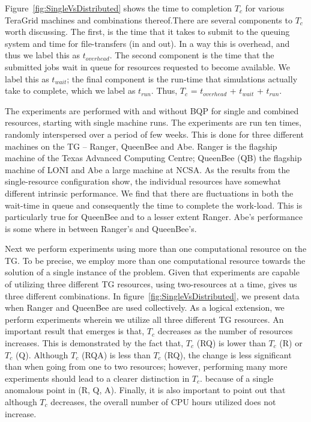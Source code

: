 \documentclass{acm_proc_article-sp}
\newcommand{\tc}{$T_c$ }
\newcommand{\tcnsp}{$T_c$}
\begin{document}
Figure~\ref{fig:SingleVsDistributed} shows the time to completion \tc
for various TeraGrid machines and combinations thereof.There are
several components to \tc worth discussing. The first, is the time
that it takes to submit to the queuing system and time for
file-transfers (in and out). In a way this is overhead, and thus we
label this as $t_{overhead}$.  The second component is the time that
the submitted jobs wait in queue for resources requested to become
available. We label this as $t_{wait}$; the final component is the
run-time that simulations actually take to complete, which we label as
$t_{run}$. Thus, \tc = $t_{overhead}$ + $t_{wait}$ + $t_{run}$.

The experiments are performed with and without BQP for single and
combined resources, starting with single machine runs. The experiments
are run ten times, randomly interspersed over a period of few
weeks. This is done for three different machines on the TG -- Ranger,
QueenBee and Abe.  Ranger is the flagship machine of the Texas
Advanced Computing Centre; QueenBee (QB) the flagship machine of LONI
and Abe a large machine at NCSA.  As the results from the
single-resource configuration show, the individual resources have
somewhat different intrinsic performance. We find that there are
fluctuations in both the wait-time in queue and consequently the time
to complete the work-load. This is particularly true for QueenBee and
to a lesser extent Ranger. Abe's performance is some where in between
Ranger's and QueenBee's.

Next we perform experiments using more than one computational resource
on the TG. To be precise, we employ more than one computational
resource towards the solution of a single instance of the problem.
Given that experiments are capable of utilizing three different TG
resources, using two-resources at a time, gives us three different
combinations. In figure~\ref{fig:SingleVsDistributed}, we present data
when Ranger and QueenBee are used collectively.  As a logical
extension, we perform experiments wherein we utilize all three
different TG resources. An important result that emerges is that, \tc
decreases as the number of resources increases. This is demonstrated
by the fact that, \tc (RQ) is lower than \tc (R) or \tc (Q).  Although
\tc (RQA) is less than \tc (RQ), the change is less significant than
when going from one to two resources; however, performing many more
experiments should lead to a clearer distinction in \tcnsp. because of
a single anomalous point in (R, Q, A).  Finally, it is also important
to point out that although \tc decreases, the overall number of CPU
hours utilized does not increase.
\end{document}
